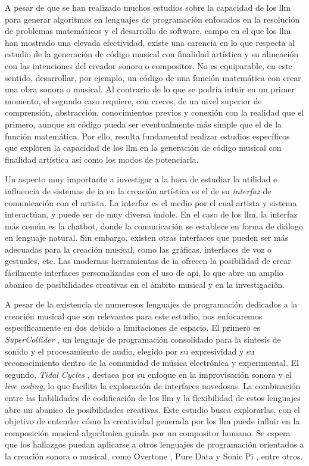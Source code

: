 A pesar de que se han realizado muchos estudios sobre la capacidad de los \gls{llm} para generar algoritmos en lenguajes de programación enfocados en la resolución de problemas matemáticos y el desarrollo de {software}, campo en el que los \gls{llm} han mostrado una elevada efectividad, existe una carencia en lo que respecta al estudio de la generación de código musical con finalidad artística y su alineación con las intenciones del creador sonoro o compositor. No es equiparable, en este sentido, desarrollar, por ejemplo, un código de una función matemática con crear una obra sonora o musical. Al contrario de lo que se podría intuir en un primer momento, el segundo caso requiere, con creces, de un nivel superior de comprensión, abstracción, conocimientos previos y conexión con la realidad que el primero, aunque su código pueda ser eventualmente más simple que el de la función matemática. Por ello, resulta fundamental realizar estudios específicos que exploren la capacidad de los \gls{llm} en la generación de código musical con finalidad artística así como los modos de potenciarla.

Un aspecto muy importante a investigar a la hora de estudiar la utilidad e influencia de sistemas de \gls{ia} en la creación artística es el de su \emph{interfaz} de comunicación con el artista. La interfaz es el medio por el cual artista y sistema interactúan, y puede ser de muy diversa índole. En el caso de los \gls{llm}, la interfaz más común es la {chatbot}, donde la comunicación se establece en forma de diálogo en lenguaje natural. Sin embargo, existen otras interfaces que pueden ser más adecuadas para la creación musical, como las gráficas, interfaces de voz o gestuales, etc. Las modernas herramientas de \gls{ia} ofrecen la posibilidad de crear fácilmente interfaces personalizadas con el uso de \gls{api}, lo que abre un amplio abanico de posibilidades creativas en el ámbito musical y en la investigación.

A pesar de la existencia de numerosos lenguajes de programación dedicados a la creación musical que son relevantes para este estudio, nos enfocaremos específicamente en dos debido a limitaciones de espacio. El primero es \emph{SuperCollider} \citep{SuperCollider2024}, un lenguaje de programación consolidado para la síntesis de sonido y el procesamiento de audio, elegido por su expresividad y su reconocimiento dentro de la comunidad de música electrónica y experimental. El segundo, \emph{Tidal Cycles} \citep{TidalCycles}, destaca por su enfoque en la improvisación sonora y el \emph{live coding}, lo que facilita la exploración de interfaces novedosas. La combinación entre las habilidades de codificación de los \gls{llm} y la flexibilidad de estos lenguajes abre un abanico de posibilidades creativas. Este estudio busca explorarlas, con el objetivo de entender cómo la creatividad generada por los \gls{llm} puede influir en la composición musical algorítmica guiada por un compositor humano. Se espera que los hallazgos puedan aplicarse a otros lenguajes de programación orientados a la creación sonora o musical, como {Overtone} \citep{OvertoneCollaborativeProgrammable}, {Pure Data} \citep{PureDataPd} y {Sonic Pi} \citep{SonicPiLive}, entre otros.

